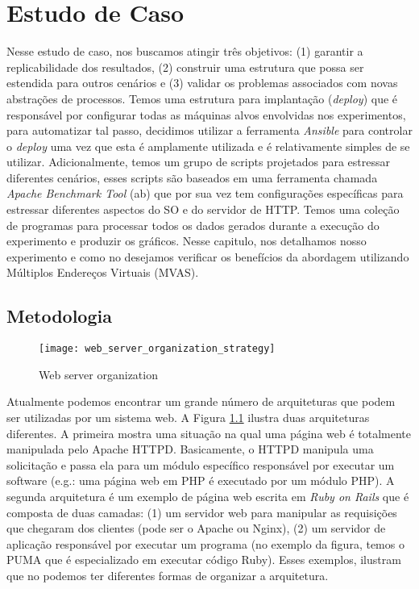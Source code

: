 \chapter{Estudo de Caso}
\label{cap:estudo-de-caso}

Nesse estudo de caso, nos buscamos atingir três objetivos: (1) garantir a
replicabilidade dos resultados, (2) construir uma estrutura que possa ser
estendida para outros cenários e (3) validar os problemas associados com novas
abstrações de processos. Temos uma estrutura para implantação (\emph{deploy})
que é responsável por configurar todas as máquinas alvos envolvidas nos
experimentos, para automatizar tal passo, decidimos utilizar a ferramenta
\emph{Ansible} para controlar o \emph{deploy} uma vez que esta é amplamente
utilizada e é relativamente simples de se utilizar. Adicionalmente, temos um
grupo de scripts projetados para estressar diferentes cenários, esses scripts
são baseados em uma ferramenta chamada \emph{Apache Benchmark Tool} (ab) que
por sua vez tem configurações específicas para estressar diferentes aspectos do
SO e do servidor de HTTP. Temos uma coleção de programas para processar todos
os dados gerados durante a execução do experimento e produzir os gráficos.
Nesse capitulo, nos detalhamos nosso experimento e como no desejamos verificar
os benefícios da abordagem utilizando Múltiplos Endereços Virtuais (MVAS).

\section{Metodologia}
\label{sec:metodologia}

\begin{figure}[!h]
  \centering
  \texttt{[image: web\_server\_organization\_strategy]}
  \caption{Web server organization}
  \label{fig:web_server}
\end{figure}

Atualmente podemos encontrar um grande número de arquiteturas que podem ser
utilizadas por um sistema web. A Figura \ref{fig:web_server} ilustra duas
arquiteturas diferentes. A primeira mostra uma situação na qual uma página web
é totalmente manipulada pelo Apache HTTPD. Basicamente, o HTTPD manipula uma
solicitação e passa ela para um módulo específico responsável por executar um
software (e.g.: uma página web em PHP é executado por um módulo PHP). A segunda
arquitetura é um exemplo de página web escrita em \emph{Ruby on Rails} que é
composta de duas camadas: (1) um servidor web para manipular as requisições que
chegaram dos clientes (pode ser o Apache ou Nginx), (2) um servidor de
aplicação responsável por executar um programa (no exemplo da figura, temos o
PUMA que é especializado em executar código Ruby). Esses exemplos, ilustram que
no podemos ter diferentes formas de organizar a arquitetura.

